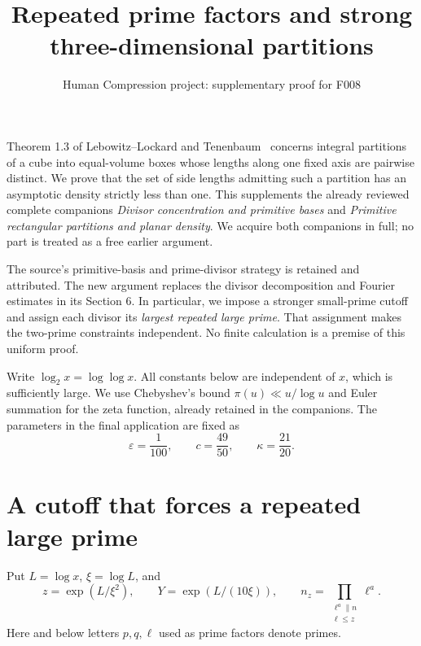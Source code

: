 \documentclass[11pt,a4paper]{article}
\title{Repeated prime factors and strong three-dimensional partitions}
\author{Human Compression project: supplementary proof for F008}
\date{}
\begin{document}
\maketitle
Theorem 1.3 of Lebowitz--Lockard and Tenenbaum~\cite{LLT} concerns
integral partitions of a cube into equal-volume boxes whose lengths
along one fixed axis are pairwise distinct. We prove that the set of
side lengths admitting such a partition has an asymptotic density
strictly less than one. This supplements the already reviewed complete
companions \emph{Divisor concentration and primitive bases} and
\emph{Primitive rectangular partitions and planar density}. We acquire
both companions in full; no part is treated as a free earlier argument.

The source's primitive-basis and prime-divisor strategy is retained and
attributed. The new argument replaces the divisor decomposition and
Fourier estimates in its Section 6. In particular, we impose a stronger
small-prime cutoff and assign each divisor its \emph{largest repeated
large prime}. That assignment makes the two-prime constraints
independent. No finite calculation is a premise of this uniform proof.

Write $\log_2x=\log\log x$. All constants below are independent of
$x$, which is sufficiently large. We use Chebyshev's bound
$\pi(u)\ll u/\log u$ and Euler summation for the zeta function,
already retained in the companions. The parameters in the final
application are fixed as
\[
 \varepsilon=\frac1{100},\qquad c=\frac{49}{50},\qquad
 \kappa=\frac{21}{20}.
\]

\section{A cutoff that forces a repeated large prime}
Put $L=\log x$, $\xi=\log L$, and
\[
 z=\exp(L/\xi^2),\qquad Y=\exp(L/(10\xi)),\qquad
 n_z=\prod_{\substack{\ell^a\parallel n\\\ell\le z}}\ell^a.
\]
Here and below letters $p,q,\ell$ used as prime factors denote primes.
\end{document}
